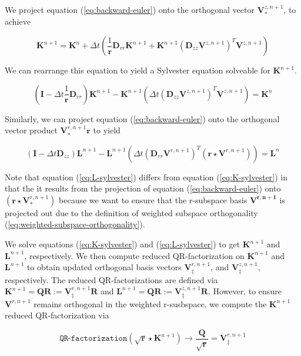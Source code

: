 \documentclass{article}
\begin{document}
We project equation (\ref{eq:backward-euler}) onto the orthogonal vector $\mathbf{V}_*^{z, n+1}$, to achieve

\begin{equation}
    \mathbf{K}^{n+1} = \mathbf{K}^n + \Delta t\left(\frac{1}{\mathbf{r}} \mathbf{D}_{rr}\mathbf{K}^{n+1} + \mathbf{K}^{n+1}\left(\mathbf{D}_{zz} \mathbf{V}^{z, n+1}\right)^T\mathbf{V}^{z, n+1}\right)
\end{equation}

We can rearrange this equation to yield a Sylvester equation solveable for $\mathbf{K}^{n+1}$. 

\begin{equation}
    \left(\mathbf{I} -  \Delta t \frac{1}{\mathbf{r}} \mathbf{D}_{rr}\right) \mathbf{K}^{n+1} - \mathbf{K}^{n+1}\left( \Delta t \left(\mathbf{D}_{zz} \mathbf{V}^{z, n+1} \right)^T\mathbf{V}^{z, n+1}\right) = \mathbf{K}^n 
	\label{eq:K-sylvester}
\end{equation}

Similarly, we can project equation (\ref{eq:backward-euler})  onto the orthogonal vector product $\mathbf{V}_*^{r, n+1} \mathbf{r}$ to yield

\begin{equation}
    \left(\mathbf{I} -  \Delta t \mathbf{D}_{zz}\right) \mathbf{L}^{n+1} - \mathbf{L}^{n+1}\left( \Delta t \left(\mathbf{D}_{rr} \mathbf{V}^{r, n+1} \right)^T \left(\mathbf{r} \star \mathbf{V}^{r, n+1} \right) \right) = \mathbf{L}^n 
	\label{eq:L-sylvester}
\end{equation}

Note that equation (\ref{eq:L-sylvester}) differs from equation (\ref{eq:K-sylvester}) in that the it results from the projection of equation (\ref{eq:backward-euler}) onto $\left(\mathbf{r}  \star \mathbf{V}_*^{r, n+1} \right)$ because we want to ensure that the r-subspace basis $\mathbf{V^{r, n+1}}$ is projected out due to the definition of weighted subspace orthogonality (\ref{eq:weighted-subspace-orthogonality}). 

We solve equations (\ref{eq:K-sylvester}) and (\ref{eq:L-sylvester}) to get $\mathbf{K}^{n+1}$ and $\mathbf{L}^{n+1}$, respectively. We then compute reduced QR-factorization on $\mathbf{K}^{n+1}$ and $\mathbf{L}^{n+1}$ to obtain updated orthogonal basis vectors $\mathbf{V}^{r, n+1}_\ddag$, and  $\mathbf{V}^{z, n+1}_\ddag$, respectively. The reduced QR-factorizations are defined via $\mathbf{K}^{n+1} = \mathbf{QR} :=\mathbf{V}^{r, n+1}_\ddag \mathbf{R}$ and $\mathbf{L}^{n+1} = \mathbf{QR} :=\mathbf{V}^{z, n+1}_\ddag \mathbf{R}$. However, to ensure $\mathbf{V}^{r, n+1}$ remains orthogonal in the weighted r-susbspace, we	compute the $\mathbf{K}^{n+1}$ reduced QR-factorization via

\begin{equation}
	\texttt{QR-factorization}(\sqrt{\mathbf{r}} \star \mathbf{K}^{n+1}) \rightarrow \frac{\mathbf{Q}}{\sqrt{\mathbf{r}}} = \mathbf{V}_\ddag^{r, n+1}
\end{equation}
\end{document}

